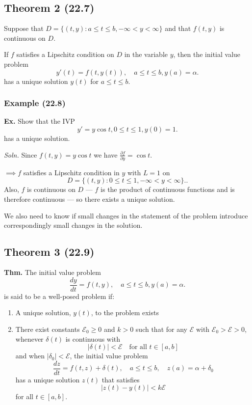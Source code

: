 \documentclass[12pt]{article}
\newcommand{\thm}{\textbf{Thm.}\xspace}
\newcommand{\Ex}{\textbf{Ex.}\xspace}
\newcommand{\bigEps}{\mathcal{E}}
\newcommand{\soln}{\textit{Soln.}\xspace}
\begin{document}
\subsection{Theorem 2 (22.7)}

Suppose that $D=\{(t,y): a\leq t \leq b, -\infty < y < \infty\}$ and that
$f(t,y)$ is continuous on $D$. 

If $f$ satisfies a Lipschitz condition on $D$ in the variable $y$, then the
initial value problem
\[
y'(t) = f(t, y(t)), \quad a \leq t \leq b, y(a) = \alpha
.\]
has a unique solution $y(t)$ for $a \leq t \leq b$.

\subsubsection{Example (22.8)}
\noindent
\Ex Show that the IVP 
\[
y' = y\cos t, 0 \leq t \leq 1, y(0) = 1
.\]
\noindent has a unique solution.

\soln Since $f(t,y) = y\cos t$ we have $\frac{\partial f}{\partial y} = \cos t$.

$\implies f$ satisfies a Lipschitz condition in $y$ with $L=1$ on 
\[
D = \{(t,y): 0 \leq t \leq 1, -\infty < y < \infty\}.
.\]
Also, $f$ is continuous on $D$ --- $f$ is the product of continuous functions and
is therefore continuous --- so there exists a unique solution.

We also need to know if small changes in the statement of the problem introduce
correspondingly small changes in the solution.

\subsection{Theorem 3 (22.9)}

\thm The initial value problem
\begin{equation*}
  \frac{dy}{dt} = f(t,y), \quad a \leq t \leq b, y(a) = \alpha
.\end{equation*}
is said to be a well-posed problem if:

\begin{enumerate}
  \item A unique solution, $y(t)$, to the problem exists
  \item There exist constants $\bigEps_0 \geq 0$ and $k > 0$ such that for any $\bigEps$ with $\bigEps_0 > \bigEps > 0$, whenever $\delta(t)$ is continuous with
    \[
      |\delta(t)| < \bigEps \quad \text{for all } t \in [a, b]
    \]
    and when $|\delta_0| < \bigEps$, the initial value problem
    \[
      \frac{dz}{dt} = f(t, z) + \delta(t), \quad a \leq t \leq b, \quad z(a) = \alpha + \delta_0
    \]
    has a unique solution $z(t)$ that satisfies
    \[
      |z(t) - y(t)| < k\bigEps
    \]
    for all $t \in [a, b]$.
\end{enumerate}
\end{document}
